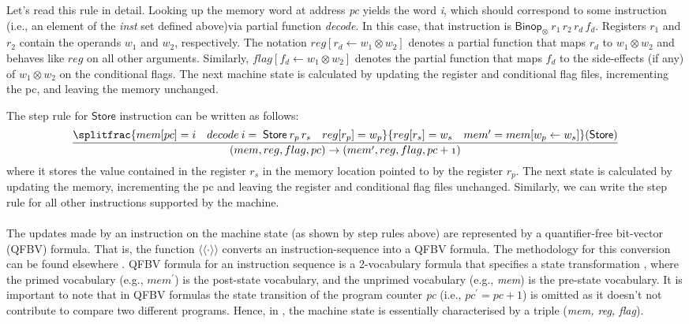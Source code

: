 Let's read this rule in detail. Looking up the memory word at address \textit{pc} yields the word \textit{i}, which should correspond to some instruction (i.e., an element of the \textit{inst} set defined above)via  partial function \textit{decode}.  In this case, that instruction is $\mathsf{Binop_\otimes} \: r_1\, r_2\, r_d\, f_d$. Registers $r_1$ and $r_2$ contain the operands $w_1$ and $w_2$, respectively. The notation $reg[r_d \leftarrow w_1 \otimes w_2]$ denotes a partial function that maps $r_d$ to $w_1 \otimes w_2$ and behaves like $reg$ on all other arguments. Similarly, $flag[f_d \leftarrow w_1 \otimes w_2]$ denotes the partial function that maps $f_d$ to the side-effects (if any) of $w_1 \otimes w_2$ on the conditional flags. The next machine state is calculated by updating the register and conditional flag files, incrementing the pc, and leaving the memory unchanged. 

The step rule for $\mathsf{Store}$ instruction can be written as follows: 
\begin{equation*}
\begin{aligned}
\mathnormal{\frac{ \splitfrac{mem[pc]=i \quad decode \: i = \; \mathsf{Store} \: r_p\, r_s \quad reg[r_p]=w_p}{reg[r_s]=w_s \quad mem^\prime = mem[w_p \leftarrow w_s] \hfill}\mathsf{(Store)}}{(mem, reg, flag, pc) \rightarrow (mem^\prime, reg, flag, pc+1)}}
\end{aligned}
\end{equation*}
where it stores the value contained in the register $r_s$ in the memory location pointed to by the register $r_p$. The next state is calculated by updating the memory, incrementing the pc and leaving the register and conditional flag files unchanged. Similarly, we can write the step rule for all other instructions supported by the machine. 
~\\
\\
The updates made by an instruction on the machine state (as shown by step rules above) are represented by a quantifier-free bit-vector (QFBV) formula.  That is, the function $\langle\!\langle \cdot \rangle\!\rangle$ converts an instruction-sequence into a QFBV formula. The methodology for this conversion can be found elsewhere \cite{lim2011symbolic}. QFBV formula for an instruction sequence is a  2-vocabulary formula that specifies a state transformation 
, where the primed vocabulary (e.g., $\textit{mem}^\prime$) is the post-state vocabulary, and the unprimed vocabulary (e.g., \textit{mem}) is the pre-state vocabulary. It is important to note that in QFBV formulas the state transition of the program counter \textit{pc} (i.e., $pc^\prime = pc+1$) is omitted as it doesn't not contribute to compare two different programs. Hence, in \tool, the machine state is essentially characterised by a triple (\textit{mem, reg, flag}).

